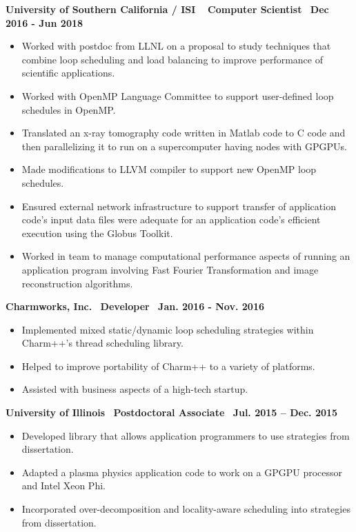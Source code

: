 \textbf{University of Southern California / ISI $\>$$\>$$\>$$\>$Computer Scientist$\>$$\>$$\>$$\>$Dec 2016 - Jun 2018}
\vspace*{-0.0in} 
\begin{itemize}
\item Worked with postdoc from LLNL on a proposal to study
techniques that combine loop scheduling and load balancing to improve
performance of scientific applications.
\item Worked with OpenMP Language Committee to support user-defined loop schedules in OpenMP.
\item Translated an x-ray tomography code written in
Matlab code to C code and then parallelizing it to run on a supercomputer
having nodes with GPGPUs. 
\item Made modifications to LLVM compiler to support new OpenMP loop schedules. 
\item Ensured external network infrastructure to support transfer of application code's input data files were adequate
for an application code's efficient execution using the Globus Toolkit. 
\item Worked in team to manage computational performance aspects of running an application program involving Fast Fourier Transformation and image reconstruction algorithms. 
\end{itemize}

\textbf{Charmworks, Inc.$\>$$\>$$\>$$\>$Developer$\>$$\>$$\>$$\>$Jan. 2016 - Nov. 2016}
\vspace*{-0.0in}
\begin{itemize}
\item Implemented mixed static/dynamic loop scheduling
strategies within Charm++'s thread scheduling library.
\item Helped to improve portability of Charm++ to a variety of platforms. 
\item Assisted with business aspects of a high-tech startup. 
\end{itemize} 

\textbf{ University of Illinois$\>$$\>$$\>$$\>$Postdoctoral Associate$\>$$\>$$\>$$\>$Jul. 2015 – Dec. 2015}
\vspace*{-0.0in}
\begin{itemize} 
\item Developed library that allows application programmers to use strategies from dissertation.
\item Adapted a plasma physics application code to work on a
GPGPU processor and Intel Xeon Phi.
\item Incorporated over-decomposition and locality-aware scheduling into strategies from dissertation.
\end{itemize}


